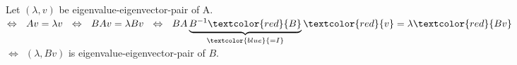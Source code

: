 {\color{solution}
Let $(\lambda,v)$ be eigenvalue-eigenvector-pair of A.\\
$\Leftrightarrow ~~Av=\lambda v~~\Leftrightarrow~~BAv=\lambda Bv~~\Leftrightarrow~~BA\underbrace{B^{-1}\textcolor{red}{B}}_{\textcolor{blue}{=I}}\textcolor{red}{v}=\lambda\textcolor{red}{Bv}$\\
$\Leftrightarrow~~(\lambda,Bv)$ is eigenvalue-eigenvector-pair of $B$.
}